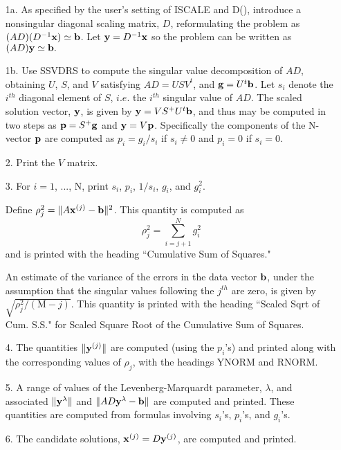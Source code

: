 \documentclass[twoside]{MATH77}
\begin{document}
\begin{itemize}
\item[1a.]  As specified by the user's setting of ISCALE and D(),
introduce a nonsingular diagonal scaling matrix, $D$, reformulating the
problem as\ $(AD)(D^{-1}{\bf x})\simeq {\bf b}$. Let ${\bf y}=D^{-1}{\bf x}$
so the problem can be written as $(AD){\bf y}\simeq {\bf b}.$

\item[1b.]  Use SSVDRS to compute the singular value decomposition of $AD$,
obtaining $U$, $S$, and $V$ satisfying $AD=USV^t$, and ${\bf g}=U^t{\bf b%
}$. Let $s_i$ denote the $i^{th}$ diagonal element of $S$, $i.e$. the $i^{th}$
singular value of $AD$. The scaled solution vector, ${\bf y}$, is given by $%
{\bf y}=VS^{+}U^t{\bf b}$, and thus may be computed in two steps as ${\bf p}%
=S^{+}{\bf g}$ and ${\bf y}=V{\bf p}$. Specifically the components of the
N-vector ${\bf p}$ are computed as $p_i=g_i/s_i$ if $s_i\neq 0$ and $p_i=0$ if $%
s_i=0.$

\item[2.]  Print the $V$ matrix.

\item[3.]  For $i=1$, ..., N, print $s_i$, $p_i$, $1/s_i$, $g_i$,
and $g_i^2.$

Define $\rho _j^2=\Vert A{\bf x}^{(j)}-{\bf b}\Vert ^2$. This
quantity is computed as%
\begin{equation*}
\rho _j^2=\sum_{i=j+1}^Ng_i^2
\end{equation*}
and is printed with the heading ``Cumulative Sum of Squares."

An estimate of the variance of the errors in the data vector ${\bf b}$,
under the assumption that the singular values following the $j^{th}$ are
zero, is given by $\sqrt{\rho _j^2/(\text{M}-j)}$. This quantity is printed
with the heading ``Scaled Sqrt of Cum. S.S." for Scaled Square Root of the
Cumulative Sum of Squares.

\item[4.]  The quantities $\Vert {\bf y}^{(j)}\Vert $ are computed
(using the $p_i$'s) and printed along with the corresponding values
of $\rho _j$, with the headings YNORM and RNORM.

\item[5.]  A range of values of the Levenberg-Marquardt parameter, $%
\lambda $, and associated $\Vert {\bf y}^\lambda \Vert $ and $\Vert AD{\bf y}%
^\lambda -{\bf b}\Vert $ are computed and printed. These quantities are
computed from formulas involving $s_i$'s, ${p_i}$'s,
and ${g_i}$'s.

\item[6.]  The candidate solutions, ${\bf x}^{(j)}=D{\bf y}^{(j)}$, are
computed and printed.
\end{itemize}
\end{document}

